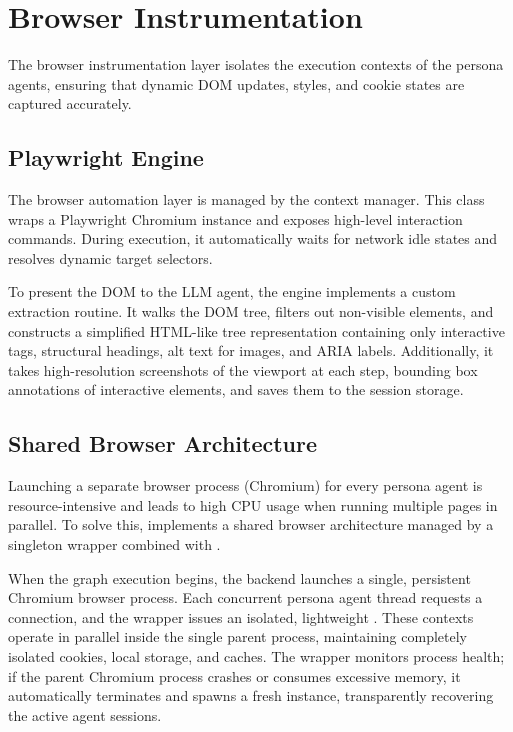 \section{Browser Instrumentation}
\label{sec:browser}

The browser instrumentation layer isolates the execution contexts of the persona agents, ensuring that dynamic DOM updates, styles, and cookie states are captured accurately.

\subsection{Playwright Engine}
\label{sec:playwright-engine}

The browser automation layer is managed by the  context manager. This class wraps a Playwright Chromium instance and exposes high-level interaction commands. During execution, it automatically waits for network idle states and resolves dynamic target selectors. 

To present the DOM to the LLM agent, the engine implements a custom  extraction routine. It walks the DOM tree, filters out non-visible elements, and constructs a simplified HTML-like tree representation containing only interactive tags, structural headings, alt text for images, and ARIA labels. Additionally, it takes high-resolution screenshots of the viewport at each step, bounding box annotations of interactive elements, and saves them to the session storage.

\subsection{Shared Browser Architecture}
\label{sec:shared-browser}

Launching a separate browser process (Chromium) for every persona agent is resource-intensive and leads to high CPU usage when running multiple pages in parallel. To solve this, \versimux{} implements a shared browser architecture managed by a singleton  wrapper combined with . 

When the graph execution begins, the backend launches a single, persistent Chromium browser process. Each concurrent persona agent thread requests a connection, and the wrapper issues an isolated, lightweight . These contexts operate in parallel inside the single parent process, maintaining completely isolated cookies, local storage, and caches. The wrapper monitors process health; if the parent Chromium process crashes or consumes excessive memory, it automatically terminates and spawns a fresh instance, transparently recovering the active agent sessions.

